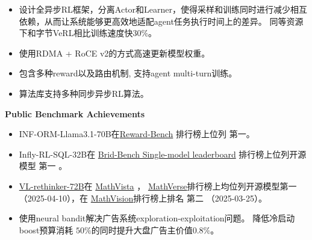 \documentclass{resume}
\begin{document}
\begin{itemize}[parsep=0.5ex]
  \item 设计全异步RL框架，分离Actor和Learner，使得采样和训练同时进行减少相互依赖，从而让系统能够更高效地适配agent任务执行时间上的差异。 同等资源下和字节VeRL相比训练速度快30$\%$。
  \item 使用RDMA + RoCE v2的方式高速更新模型权重。
  \item 包含多种reward以及路由机制, 支持agent multi-turn训练。
  \item 算法库支持多种同步异步RL算法。  
 
\end{itemize}


\textbf{Public Benchmark Achievements}
\begin{itemize}[parsep=0.5ex]
  \item INF-ORM-Llama3.1-70B在\href{https://huggingface.co/spaces/allenai/reward-bench}{Reward-Bench} 排行榜上位列 {\color{red} 第一}。
    \item Infly-RL-SQL-32B在 \href{https://bird-bench.github.io/} {Brid-Bench Single-model leaderboard} 排行榜上位列开源模型 {\color{red}第一} 。
\item  \href{https://tiger-ai-lab.github.io/VL-Rethinker/}{VL-rethinker-72B}在  \href{https://mathvista.github.io/} {MathVista} ， \href{https://mathverse-cuhk.github.io/}{MathVerse}排行榜上均位列开源模型{\color{red}第一} （2025-04-10），在 \href{https://mathllm.github.io/mathvision/}{MathVision}排行榜上排名 {\color{red}第二} （2025-03-25）。
    
\end{itemize}





\begin{itemize}[parsep=0.5ex]
    \item 使用neural bandit解决广告系统exploration-exploitation问题。 降低冷启动boost预算消耗 $50\%$的同时提升大盘广告主价值$0.8\%$。
\end{itemize}
\end{document}
